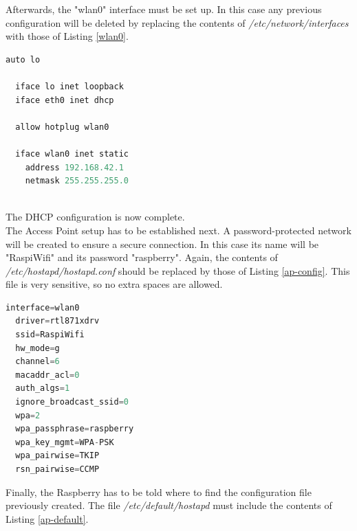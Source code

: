 \bigskip
Afterwards, the "wlan0" interface must be set up. In this case any previous configuration will be deleted by replacing the contents of \textit{/etc/network/interfaces} with those of Listing \ref{wlan0}.\\

	\begin{minipage}{\linewidth}%
	\begin{lstlisting}[label=wlan0,caption=Interface Configuration {[} /etc/dnetwork/interfaces {]} ,language=python ]
  auto lo

  iface lo inet loopback
  iface eth0 inet dhcp

  allow hotplug wlan0

  iface wlan0 inet static
    address 192.168.42.1
    netmask 255.255.255.0
	
	\end{lstlisting}
	\end{minipage}

\bigskip
The DHCP configuration is now complete.\\

The Access Point setup has to be established next. A password-protected network will be created to ensure a secure connection. In this case its name will be "RaspiWifi" and its password "raspberry". Again, the contents of \textit{/etc/hostapd/hostapd.conf} should be replaced by those of Listing \ref{ap-config}. This file is very sensitive, so no extra spaces are allowed.\\

	\begin{minipage}{\linewidth}%
	\begin{lstlisting}[label=ap-config,caption=AP Configuration {[} /etc/hostapd/hostapd.conf {]} ,language=python ]
  interface=wlan0
  driver=rtl871xdrv
  ssid=RaspiWifi
  hw_mode=g
  channel=6
  macaddr_acl=0
  auth_algs=1
  ignore_broadcast_ssid=0
  wpa=2
  wpa_passphrase=raspberry
  wpa_key_mgmt=WPA-PSK
  wpa_pairwise=TKIP
  rsn_pairwise=CCMP

  	\end{lstlisting}
	\end{minipage}

\bigskip
Finally, the Raspberry has to be told where to find the configuration file previously created. The file \textit{/etc/default/hostapd} must include the contents of Listing \ref{ap-default}.

